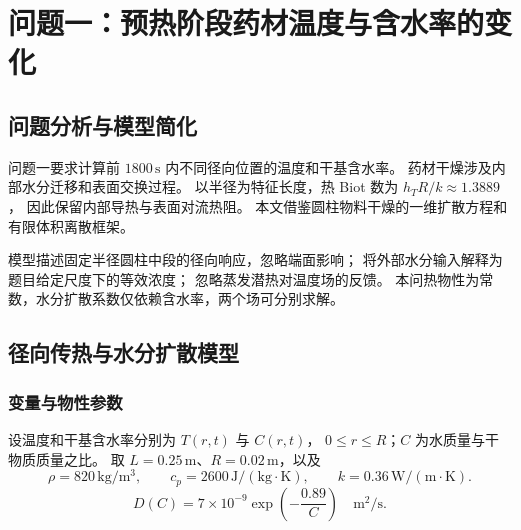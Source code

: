 \section{问题一：预热阶段药材温度与含水率的变化}
\label{sec:q1}

\subsection{问题分析与模型简化}
问题一要求计算前 $1800\,\mathrm{s}$ 内不同径向位置的温度和干基含水率。
药材干燥涉及内部水分迁移和表面交换过程\cite{wang2024}。
以半径为特征长度，热 Biot 数为 $h_TR/k\approx1.3889$，
因此保留内部导热与表面对流热阻。
本文借鉴圆柱物料干燥的一维扩散方程和有限体积离散框架\cite{dasilva2014}。

模型描述固定半径圆柱中段的径向响应，忽略端面影响；
将外部水分输入解释为题目给定尺度下的等效浓度；
忽略蒸发潜热对温度场的反馈。
本问热物性为常数，水分扩散系数仅依赖含水率，两个场可分别求解。

\subsection{径向传热与水分扩散模型}
\subsubsection{变量与物性参数}
设温度和干基含水率分别为 $T(r,t)$ 与 $C(r,t)$，
$0\le r\le R$；$C$ 为水质量与干物质质量之比。
取 $L=0.25\,\mathrm{m}$、$R=0.02\,\mathrm{m}$，以及
\begin{equation}
\rho=820\,\mathrm{kg/m^3},\qquad
c_p=2600\,\mathrm{J/(kg\cdot K)},\qquad
k=0.36\,\mathrm{W/(m\cdot K)}.
\label{eq:q1-thermal-properties}
\end{equation}
\begin{equation}
D(C)=7\times10^{-9}\exp\!\left(-\frac{0.89}{C}\right)
\quad\mathrm{m^2/s}.
\label{eq:q1-diffusivity}
\end{equation}

